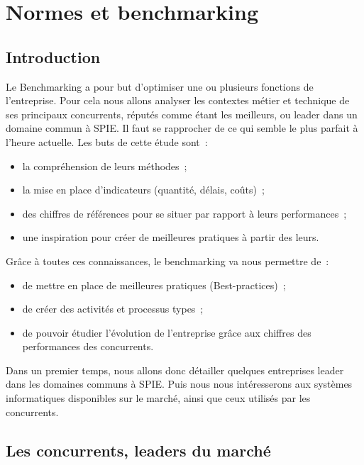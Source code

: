 \chapter{Normes et benchmarking}


\section{Introduction}
    	Le Benchmarking a pour but d'optimiser une ou plusieurs fonctions de l'entreprise. Pour cela nous allons analyser les contextes métier et technique de ses principaux concurrents, réputés comme étant les meilleurs, ou leader dans un domaine commun à SPIE. Il faut se rapprocher de ce qui semble le plus parfait à l'heure actuelle.
    	Les buts de cette étude sont~:
    \begin{itemize}
    	\item la compréhension de leurs méthodes~;
    	\item la mise en place d'indicateurs (quantité, délais, coûts)~;
    	\item des chiffres de références pour se situer par rapport à leurs performances~;
    	\item une inspiration pour créer de meilleures pratiques à partir des leurs.
    \end{itemize}
    \bigbreak
    	Grâce à toutes ces connaissances, le benchmarking va nous permettre de~:
    \begin{itemize}
    	\item de mettre en place de meilleures pratiques (Best-practices)~;
    	\item de créer des activités et processus types~;
    	\item de pouvoir étudier l'évolution de l'entreprise grâce aux chiffres des performances des concurrents.
    \end{itemize}
    \bigbreak
    	Dans un premier temps, nous allons donc détailler quelques entreprises leader dans les domaines communs à SPIE. Puis nous nous intéresserons aux systèmes informatiques disponibles sur le marché, ainsi que ceux utilisés par les concurrents.

\section{Les concurrents, leaders du marché}
